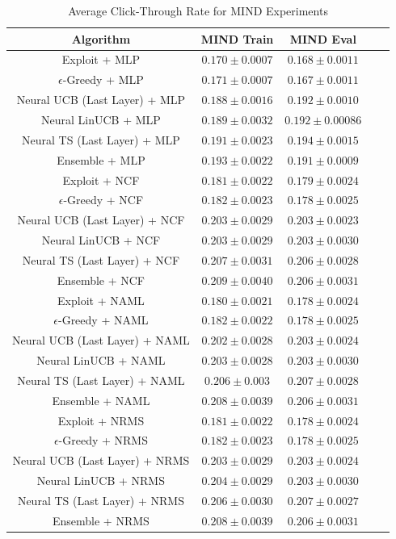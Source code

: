 \begin{table}[t!]
\small
  \caption{Average Click-Through Rate for MIND Experiments}
  \vspace{-0.1in}
  \label{tab:mind_reward}
  \begin{tabular}{ccccc}
    \toprule
    Algorithm & MIND Train & MIND Eval\\
    \midrule 
    Exploit + MLP & $0.170 \pm 0.0007$ & $0.168 \pm 0.0011$ \\
    $\epsilon$-Greedy + MLP  & $0.171 \pm 0.0007$ & $0.167 \pm 0.0011$\\
    Neural UCB (Last Layer) + MLP & $0.188 \pm 0.0016$ & $0.192 \pm 0.0010$\\
    Neural LinUCB + MLP & $0.189 \pm 0.0032$ & $0.192 \pm 0.00086$\\
    Neural TS (Last Layer) + MLP & $0.191 \pm 0.0023$ & $0.194 \pm 0.0015$\\
    Ensemble + MLP & $0.193 \pm 0.0022$ & $0.191 \pm 0.0009$\\

    \midrule
    Exploit + NCF & $0.181 \pm 0.0022$ & $0.179 \pm 0.0024$\\
    $\epsilon$-Greedy + NCF & $0.182 \pm 0.0023$ & $0.178 \pm 0.0025$\\
    Neural UCB (Last Layer) + NCF& $0.203 \pm 0.0029$ & $0.203 \pm 0.0023$\\
    Neural LinUCB + NCF & $0.203 \pm 0.0029$ & $0.203 \pm 0.0030$\\
    Neural TS (Last Layer) + NCF & $0.207 \pm 0.0031$ & $0.206 \pm 0.0028$\\
    Ensemble + NCF & $0.209 \pm 0.0040$ & $0.206 \pm 0.0031$\\
    
    \midrule
    Exploit + NAML & $0.180 \pm 0.0021$ & $0.178 \pm 0.0024$\\
    $\epsilon$-Greedy + NAML & $0.182 \pm 0.0022$ & $0.178 \pm 0.0025$\\
    Neural UCB (Last Layer) + NAML & $0.202 \pm 0.0028$ & $0.203 \pm 0.0024$\\
    Neural LinUCB + NAML & $0.203 \pm 0.0028$ & $0.203 \pm 0.0030$ \\
    Neural TS (Last Layer) + NAML & $0.206 \pm 0.003$ & $0.207 \pm 0.0028$\\
    Ensemble + NAML & $0.208 \pm 0.0039$ & $0.206 \pm 0.0031$\\

    \midrule
    Exploit + NRMS & $0.181 \pm 0.0022$ & $0.178 \pm 0.0024$\\
   $\epsilon$-Greedy + NRMS & $0.182 \pm 0.0023$ & $0.178 \pm 0.0025$\\
    Neural UCB (Last Layer) + NRMS & $0.203 \pm 0.0029$ & $0.203 \pm 0.0024$\\
    Neural LinUCB + NRMS & $0.204 \pm 0.0029$ & $0.203 \pm 0.0030$\\
    Neural TS (Last Layer) + NRMS & $0.206 \pm 0.0030$ & $0.207 \pm 0.0027$\\
    Ensemble + NRMS & $0.208 \pm 0.0039$ & $0.206 \pm 0.0031$\\


\end{tabular}
\end{table}
